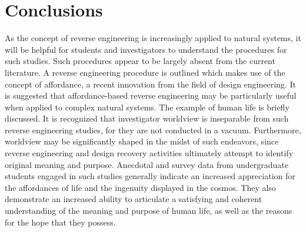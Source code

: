 \section{Conclusions}

As the concept of reverse engineering is increasingly applied to natural
systems, it will be helpful for students and investigators to
understand the procedures for such studies. Such procedures appear to
be largely absent from the current literature. A reverse engineering
procedure is outlined which makes use of the concept of affordance, a
recent innovation from the field of design engineering. It is suggested
that affordance-based reverse engineering may be particularly useful
when applied to complex natural systems. The example of human life is
briefly discussed. It is recognized that investigator worldview is
inseparable from such reverse engineering studies, for they
are not conducted in a vacuum. 
Furthermore, worldview may be
significantly shaped in the midst of such endeavors, since reverse
engineering and design recovery activities ultimately attempt to
identify original meaning and purpose. Anecdotal and survey data from
undergraduate students engaged in such studies generally indicate an
increased appreciation for the affordances of life and the ingenuity
displayed in the cosmos. They also demonstrate an increased ability to
articulate a satisfying and coherent understanding of the meaning and
purpose of human life, as well as the reasons for the hope that they
possess.

